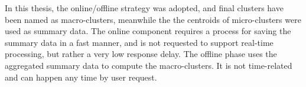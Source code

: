 In this thesis, the online/offline strategy was adopted, and final clusters have been named as macro-clusters, meanwhile the the centroids of micro-clusters were used as summary data. The online component requires a process for saving the summary data in a fast manner, and is not requested to support real-time processing, but rather a very low response delay. The offline phase uses the aggregated summary data to compute the macro-clusters. It is not time-related and can happen any time by user request.




    










